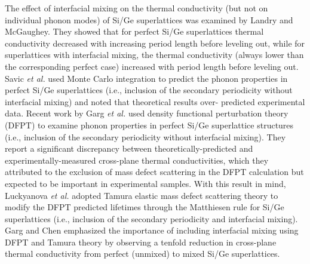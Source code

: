 \documentclass[aps,prb,preprint,preprintnumbers,amsmath,amssymb,floatfix,superscriptaddress]{revtex4}
\begin{document}
The effect of interfacial mixing on the thermal conductivity (but not on individual phonon modes) of Si/Ge superlattices was examined by Landry and McGaughey.\cite{PhysRevB.79.075316} They showed that for perfect Si/Ge superlattices thermal conductivity decreased with increasing period length before leveling out, while for superlattices with interfacial mixing, the thermal conductivity (always lower than the corresponding perfect case) increased with period length before leveling out. Savic \textit{et al.} used Monte Carlo integration to predict the phonon properties in perfect Si/Ge superlattices (i.e., inclusion of the secondary periodicity without interfacial mixing) and noted that theoretical results over- predicted experimental data.\cite{savic:073113} Recent work by Garg \textit{et al.} used density functional perturbation theory (DFPT) to examine phonon properties in perfect Si/Ge superlattice structures (i.e., inclusion of the secondary periodicity without interfacial mixing). They report a significant discrepancy between theoretically-predicted and experimentally-measured cross-plane thermal conductivities, which they attributed to the exclusion of mass defect scattering in the DFPT calculation but expected to be important in experimental samples. \cite{doi:10.1021/nl202186y} With this result in mind, Luckyanova \textit{et al.} \cite{Luckyanova16112012} adopted Tamura elastic mass defect scattering theory \cite{tamura_isotope_1983} to modify the DFPT predicted lifetimes through the Matthiesen rule for Si/Ge superlattices (i.e., inclusion of the secondary periodicity and interfacial mixing). Garg and Chen emphasized the importance of including interfacial mixing using DFPT and Tamura theory by observing a tenfold reduction in cross-plane thermal conductivity from perfect (unmixed) to mixed Si/Ge superlattices.\cite{PhysRevB.87.140302}
\end{document}
